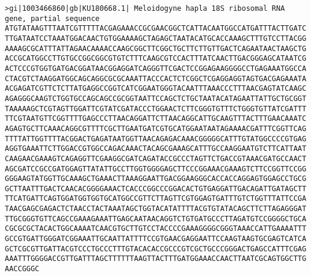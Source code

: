 \documentclass[11pt]{article}
\begin{document}
\begin{Verbatim}[commandchars=\\\{\}]
>gi|1003466860|gb|KU180668.1| Meloidogyne hapla 18S ribosomal RNA gene, partial sequence
ATGTATAAGTTTAATCGTTTTTACGAGAAACCGCGAACGGCTCATTACAATGGCCATGATTTACTTGATC
TTGATAATCCTAAATGGACAACTGTGGAAAAGCTAGAGCTAATACATGCACCAAAGCTTTGTCCTTACGG
AAAAGCGCATTTATTAGAACAAAACCAAGCGGCTTCGGCTGCTTCTTGTTGACTCAGAATAACTAAGCTG
ACCGCATGGCCTTGTGCCGGCGGCGTGTCTTTCAAGCGTCCACTTTATCAACTTGACGGGAGCATAATCG
ACTCCCGTGGTGATGACGGATAACGGAGGATCAGGGTTCGACTCCGGAGAAGGGGCCTGAGAAATGGCCA
CTACGTCTAAGGATGGCAGCAGGCGCGCAAATTACCCACTCTCGGCTCGAGGAGGTAGTGACGAGAAATA
ACGAGATCGTTCTCTTATGAGGCCGGTCATCGGAATGGGTACAATTTAAACCCTTTAACGAGTATCAAGC
AGAGGGCAAGTCTGGTGCCAGCAGCCGCGGTAATTCCAGCTCTGCTAATACATAGAATTATTGCTGCGGT
TAAAAAGCTCGTAGTTGGATTCGTATCGATACCCTGGAACTCTTCGGGTGTTTCTGGGTGTTATCGATTT
TTCGTAATGTTCGGTTTTGAGCCCTTAACAGGATTCTTAACAGGCATTGCAAGTTTACTTTGAACAAATC
AGAGTGCTTCAAACAGGCGTTTTCGCTTGAATGATCGTGCATGGAATAATAGAAAACGATTTCGGTTCAG
TTTTATTGGTTTTACGGACTGAGATAATGGTTAACAGAGACAAACGGGGGCATTTGTATGGCCCCGTGAG
AGGTGAAATTCTTGGACCGTGGCCAGACAAACTACAGCGAAAGCATTTGCCAAGGAATGTCTTCATTAAT
CAAGAACGAAAGTCAGAGGTTCGAAGGCGATCAGATACCGCCCTAGTTCTGACCGTAAACGATGCCAACT
AGCGATCCGCCGATGGAGTTATATTGCCTTGGTGGGGAGCTTCCCGGAAACGAAAGTCTTCCGGTTCCGG
GGGAAGTATGGTTGCAAAGCTGAAACTTAAAGGAATTGACGGAAGGGCACCACCAGGAGTGGAGCCTGCG
GCTTAATTTGACTCAACACGGGGAAACTCACCCGGCCCGGACACTGTGAGGATTGACAGATTGATAGCTT
TTCATGATTCAGTGGATGGTGGTGCATGGCCGTTCTTAGTTCGTGGAGTGATTTGTCTGGTTTATTCCGA
TAACGAGCGAGACTCTAACCTACTAAATAGCTGGTACATATTTTACGTGTATACAGCTTCTTAGAGGGAT
TTGCGGGTGTTCAGCCGAAAGAAATTGAGCAATAACAGGTCTGTGATGCCCTTAGATGTCCGGGGCTGCA
CGCGCGCTACACTGGCAAAATCAACGTGCTTGTCCTACCCCGAAAGGGGCGGGTAAACCATTGAAAATTT
GCCGTGATTGGGATCGGAAATTGCAATTATTTTCCGTGAACGAGGAATTCCAAGTAAGTGCGAGTCATCA
GCTCGCGTTGATTACGTCCCTGCCCTTTGTACACACCGCCCGTCGCTGCCCGGGACTGAGCCATTTCGAG
AAATTTGGGGACCGTTGATTTAGCTTTTTTAAGTTACTTTGATGGAAACCAACTTAATCGCAGTGGCTTG
AACCGGGC


\end{Verbatim}
\end{document}
